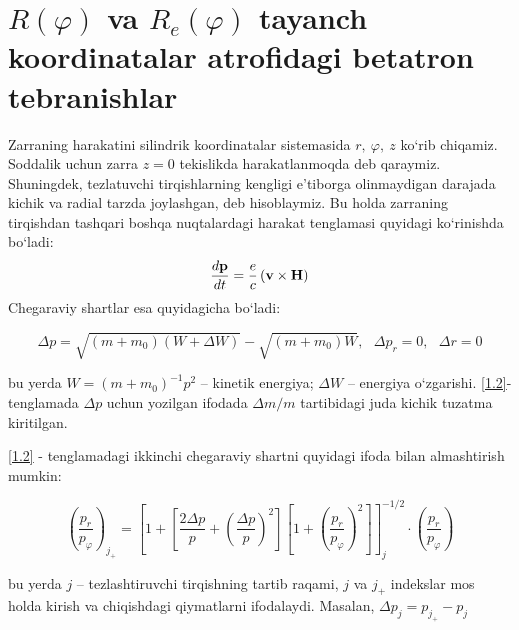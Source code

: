 \documentclass[14pt]{article}
\begin{document}
	\section{$R(\varphi)$ va $R_{e}(\varphi)$ tayanch koordinatalar atrofidagi betatron tebranishlar}
	
	\hspace{0.4cm}
	Zarraning harakatini silindrik koordinatalar sistemasida $r,\ \varphi,\ z$ ko`rib chiqamiz. Soddalik uchun zarra $z = 0$ tekislikda harakatlanmoqda deb qaraymiz. Shuningdek, tezlatuvchi tirqishlarning kengligi e'tiborga olinmaydigan darajada kichik va radial tarzda joylashgan, deb hisoblaymiz. Bu holda zarraning tirqishdan tashqari boshqa nuqtalardagi harakat tenglamasi quyidagi ko`rinishda bo`ladi:
	\begin{equation}
	\frac{d\textbf{p}}{dt} = \frac{e}{c}\left(\textrm{\textbf{v}}\times\mathbf{H}\right)
	\label{1.1}
	\end{equation}
	Chegaraviy shartlar esa quyidagicha bo`ladi:
	
	\begin{equation}
	\Delta p = \sqrt{(m+m_{0})(W+\Delta W)} - \sqrt{(m+m_{0})W},\ \ \ \Delta p_{r} = 0,\ \ \ \Delta r = 0
	\label{1.2}
	\end{equation}

	bu yerda $W = (m+m_{0})^{-1}p^{2}$ -- kinetik energiya; $\Delta W$ -- energiya o`zgarishi. \eqref{1.2}-tenglamada $\Delta p$ uchun yozilgan ifodada $\Delta m/m$ tartibidagi juda kichik tuzatma kiritilgan. 
	
	\eqref{1.2} - tenglamadagi ikkinchi chegaraviy shartni quyidagi ifoda bilan almashtirish mumkin:
	
$$
	\left(
	\frac{p_{r}}{p_{\varphi}}
	\right)_{j_{+}} = 
	\left[1+
		\left[
		\frac{2\Delta p}{p} + \left(\frac{\Delta p}{p}
		\right)^{2}
		\right]
		\left[
		1+ \left(\frac{p_{r}}{p_{\varphi}}
		\right)^{2}
		\right]	
\right]^{-1/2}_{j}\cdot
\left(
\frac{p_{r}}{p_{\varphi}}
\right)
	$$
	
	bu yerda $j$ -- tezlashtiruvchi tirqishning tartib raqami, $j$ va $j_{+}$ indekslar mos holda kirish va chiqishdagi qiymatlarni ifodalaydi. Masalan, $\Delta p_{j} = p_{j_{+}}-p_{j}$
\end{document}
